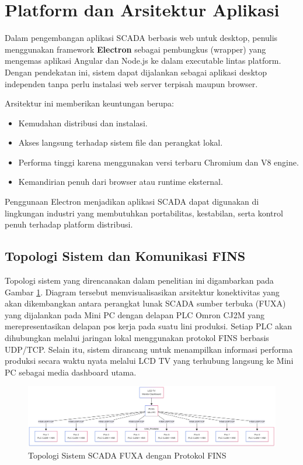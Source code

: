 \section{Platform dan Arsitektur Aplikasi}
Dalam pengembangan aplikasi SCADA berbasis web untuk desktop, penulis menggunakan framework \textbf{Electron} sebagai pembungkus (wrapper) yang mengemas aplikasi Angular dan Node.js ke dalam executable lintas platform. Dengan pendekatan ini, sistem dapat dijalankan sebagai aplikasi desktop independen tanpa perlu instalasi web server terpisah maupun browser.

Arsitektur ini memberikan keuntungan berupa:
\begin{itemize}
    \item Kemudahan distribusi dan instalasi.
    \item Akses langsung terhadap sistem file dan perangkat lokal.
    \item Performa tinggi karena menggunakan versi terbaru Chromium dan V8 engine.
    \item Kemandirian penuh dari browser atau runtime eksternal.
\end{itemize}

Penggunaan Electron menjadikan aplikasi SCADA dapat digunakan di lingkungan industri yang membutuhkan portabilitas, kestabilan, serta kontrol penuh terhadap platform distribusi.

\subsection{Topologi Sistem dan Komunikasi FINS}

Topologi sistem yang direncanakan dalam penelitian ini digambarkan pada Gambar \ref{fig:topologi}. Diagram tersebut memvisualisasikan arsitektur konektivitas yang akan dikembangkan antara perangkat lunak SCADA sumber terbuka (FUXA) yang dijalankan pada Mini PC dengan delapan PLC Omron CJ2M yang merepresentasikan delapan pos kerja pada suatu lini produksi. Setiap PLC akan dihubungkan melalui jaringan lokal menggunakan protokol FINS berbasis UDP/TCP. Selain itu, sistem dirancang untuk menampilkan informasi performa produksi secara waktu nyata melalui LCD TV yang terhubung langsung ke Mini PC sebagai media dashboard utama.

\begin{figure}[H]
    \centering
    \includegraphics[width=\textwidth]{images/topologi_fuxa_fins.png} %
    \caption{Topologi Sistem SCADA FUXA dengan Protokol FINS}
    \label{fig:topologi}
\end{figure}

